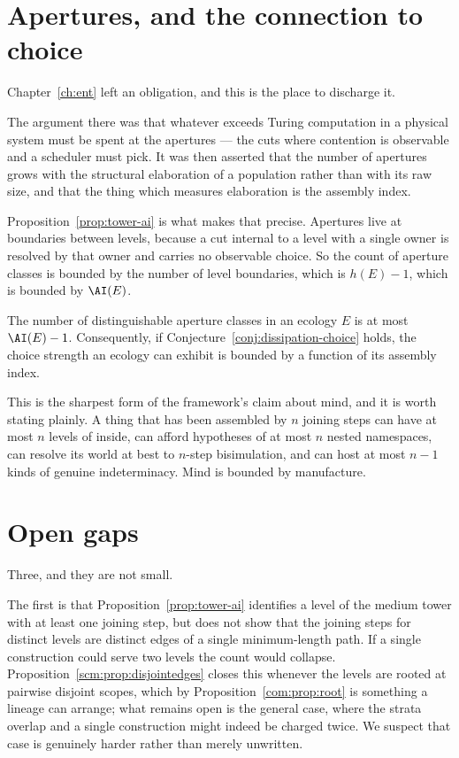 \section{Apertures, and the connection to choice}

Chapter~\ref{ch:ent} left an obligation, and this is the place to
discharge it.

The argument there was that whatever exceeds Turing computation in a
physical system must be spent at the apertures --- the cuts where
contention is observable and a scheduler must pick.
It was then asserted that the number of apertures grows with the
structural elaboration of a population rather than with its raw size, and
that the thing which measures elaboration is the assembly index.

Proposition~\ref{prop:tower-ai} is what makes that precise.
Apertures live at boundaries between levels, because a cut internal to a
level with a single owner is resolved by that owner and carries no
observable choice.
So the count of aperture classes is bounded by the number of level
boundaries, which is $h(E) - 1$, which is bounded by $\AI(E)$.

\begin{corollary}
\label{cor:ai-choice}
The number of distinguishable aperture classes in an ecology $E$ is at
most $\AI(E) - 1$.
Consequently, if Conjecture~\ref{conj:dissipation-choice} holds, the
choice strength an ecology can exhibit is bounded by a function of its
assembly index.
\end{corollary}

This is the sharpest form of the framework's claim about mind, and it is
worth stating plainly.
A thing that has been assembled by $n$ joining steps can have at most $n$
levels of inside, can afford hypotheses of at most $n$ nested
namespaces, can resolve its world at best to $n$-step bisimulation, and
can host at most $n-1$ kinds of genuine indeterminacy.
Mind is bounded by manufacture.

\section{Open gaps}

Three, and they are not small.

The first is that Proposition~\ref{prop:tower-ai} identifies a level of
the medium tower with at least one joining step, but does not show that
the joining steps for distinct levels are distinct edges of a single
minimum-length path.
If a single construction could serve two levels the count would collapse.
Proposition~\ref{scm:prop:disjointedges} closes this whenever the levels
are rooted at pairwise disjoint scopes, which by
Proposition~\ref{com:prop:root} is something a lineage can arrange; what
remains open is the general case, where the strata overlap and a single
construction might indeed be charged twice.
We suspect that case is genuinely harder rather than merely unwritten.

